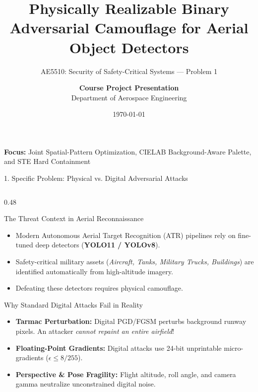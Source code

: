 \documentclass[aspectratio=169, 10pt]{beamer}
\title[Binary Adversarial Camouflage]{\textbf{Physically Realizable Binary Adversarial Camouflage for Aerial Object Detectors}}
\subtitle{AE5510: Security of Safety-Critical Systems — Problem 1}
\author[AE5510 Project 1]{\textbf{Course Project Presentation} \\ Department of Aerospace Engineering}
\institute[IIT Madras]{\textbf{Indian Institute of Technology Madras}}
\date{\today}
\begin{document}
\begin{frame}[plain]
  \titlepage
  \begin{center}
    \footnotesize
    \textcolor{DarkSlate}{\textbf{Focus:} Joint Spatial-Pattern Optimization, CIELAB Background-Aware Palette, and STE Hard Containment}
  \end{center}
\end{frame}

\begin{frame}{1. Specific Problem: Physical vs. Digital Adversarial Attacks}
\begin{columns}[T]
  \begin{column}{0.48\textwidth}
    \begin{block}{The Threat Context in Aerial Reconnaissance}
      \begin{itemize}\small
        \item Modern Autonomous Aerial Target Recognition (ATR) pipelines rely on fine-tuned deep detectors (\textbf{YOLO11 / YOLOv8}).
        \item Safety-critical military assets (\textit{Aircraft, Tanks, Military Trucks, Buildings}) are identified automatically from high-altitude imagery.
        \item Defeating these detectors requires physical camouflage.
      \end{itemize}
    \end{block}
    
    \begin{alertblock}{Why Standard Digital Attacks Fail in Reality}
      \begin{itemize}\small
        \item \textbf{Tarmac Perturbation:} Digital PGD/FGSM perturbs background runway pixels. An attacker \textit{cannot repaint an entire airfield}!
        \item \textbf{Floating-Point Gradients:} Digital attacks use 24-bit unprintable micro-gradients ($\epsilon \le 8/255$).
        \item \textbf{Perspective \& Pose Fragility:} Flight altitude, roll angle, and camera gamma neutralize unconstrained digital noise.
      \end{itemize}
    \end{alertblock}
  \end{column}


\end{columns}
\end{frame}
\end{document}
